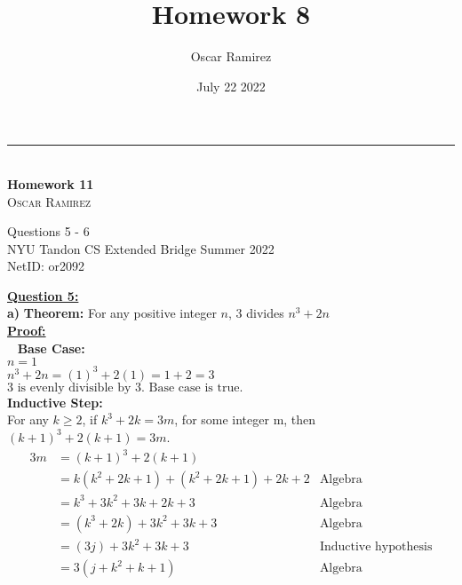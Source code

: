\documentclass[12pt, letterpaper, twoside]{article}
\title{\textbf{Homework 8}}
\author{Oscar Ramirez}
\date{July 22 2022}
\begin{document}
\begin{titlepage}   

    \raggedleft %

    \rule{1pt}{\textheight} %
    \hspace{0.05\textwidth} %
    \parbox[b]{0.75\textwidth}{ %
        {\large\textit{}}\\[4\baselineskip]

        {\Huge\bfseries Homework 11}\\[2\baselineskip] %

        {\Large\textsc{Oscar Ramirez}} %

        \vspace{0.47\textheight} %
        {\noindent Questions 5 - 6}\\[0.1\baselineskip]
        {\noindent NYU Tandon CS Extended Bridge Summer 2022}\\[0.1\baselineskip]
        {\noindent NetID: or2092}\\[\baselineskip]
    }

\end{titlepage}
\newpage\noindent \textbf{\underline{Question 5:}}\\
\break
\textbf{a)} \textbf{Theorem:} For any positive integer $n$, $3$ divides $n^3 + 2n$\\
\break
\textbf{\underline{Proof:}}\\\
\break
\textbf{Base Case:}\\
$n = 1$\\
$n^3 + 2n = (1)^3 + 2(1) = 1 + 2 = 3$\\
$\text{3 is evenly divisible by 3. Base case is true.}$\\
\break
\textbf{Inductive Step:}\\
For any $k \geq 2$, if $k^3 + 2k = 3m$, for some integer m, then $(k + 1)^3 + 2(k + 1) = 3m$.
\begin{align*}
3m &= (k + 1)^3 + 2(k + 1)\\
&= k(k^2 + 2k + 1) + (k^2 + 2k + 1) + 2k + 2 &\text{Algebra}\\
&= k^3 + 3k^2 + 3k + 2k + 3 &\text{Algebra}\\
&= (k^3 + 2k) + 3k^2 + 3k + 3 &\text{Algebra}\\
&= (3j) + 3k^2 + 3k + 3 &\text{Inductive hypothesis}\\
&= 3(j + k^2 + k + 1) &\text{Algebra}\\
\end{align*}
\end{document}
